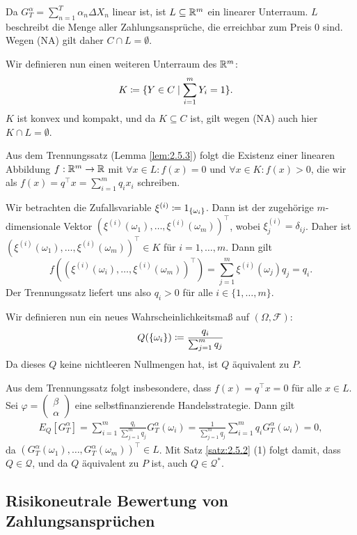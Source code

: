 \documentclass[a4paper,twoside,DIV15,BCOR12mm]{scrbook}
\newcommand{\cF}{\mathcal F}
\newcommand{\cQ}{\mathcal Q}
\begin{document}
\begin{beweis}
Da $G_T^\alpha = \sum_{n=1}^T \alpha_n \Delta X_n$ linear ist, ist $L\subseteq\mathbb{R}^m$ ein linearer Unterraum. $L$ beschreibt die Menge aller Zahlungsansprüche, die erreichbar zum Preis 0 sind. Wegen (NA) gilt daher $C\cap L =\emptyset$.

Wir definieren nun einen weiteren Unterraum des $\mathbb{R}^m$:
\begin{align*}
K &\da \{Y\in C \mid  \sum_{i=1}^m Y_i = 1\}.
\end{align*}
$K$ ist konvex und kompakt, und da $K\subseteq C$ ist, gilt wegen (NA) auch hier $K\cap L=\emptyset$.

Aus dem Trennungssatz (Lemma \ref{lem:2.5.3}) folgt die Existenz einer linearen Abbildung $f:\mathbb{R}^m\to \mathbb{R}$ mit $\forall x\in L: f(x)=0$ und $\forall x\in K: f(x) >0$, die wir als $f(x) = q^\top x = \sum_{i=1}^m q_i x_i$ schreiben.

Wir betrachten die Zufallsvariable $\xi^{(i)} \da 1_{\{\omega_i\}}$. Dann ist der zugehörige $m$-dimensionale Vektor $(\xi^{(i)}(\omega_1),\ldots,\xi^{(i)}(\omega_m))^\top$, wobei $\xi_j^{(i)} = \delta_{ij}$. Daher ist  $(\xi^{(i)}(\omega_1),\ldots,\xi^{(i)}(\omega_m))^\top\in K$ für $i=1,\ldots,m$. Dann gilt 
\[
f((\xi^{(i)}(\omega_i),\ldots,\xi^{(i)}(\omega_m))^\top) = \sum_{j=1}^m \xi^{(i)}(\omega_j)q_j = q_i.
\]
Der Trennungssatz liefert uns also $q_i>0$ für alle $i\in\{1,\ldots,m\}$.

Wir definieren nun ein neues Wahrscheinlichkeitsmaß auf $(\Omega, \cF)$:
\[
Q(\{\omega_i\}) \da \frac{q_i}{\sum_{j=1}^m q_j}
\]
Da dieses $Q$ keine nichtleeren Nullmengen hat, ist $Q$ äquivalent zu $P$.

Aus dem Trennungssatz folgt insbesondere, dass $f(x)=q^\top x=0$ für alle $x\in L$. Sei 
$\varphi=\left(\begin{smallmatrix} \beta \\ \alpha \end{smallmatrix}\right)$
eine selbstfinanzierende Handelsstrategie. Dann gilt 
\begin{align*}
E_Q[G_T^\alpha] = \sum_{i=1}^m \frac{q_i}{\sum_{j=1}^m q_j} G_T^\alpha(\omega_i) = \frac{1}{\sum_{j=1}^m q_j} \sum_{i=1}^m q_i G_T^\alpha(\omega_i) = 0,
\end{align*}
da $(G_T^\alpha(\omega_1),\ldots,G_T^\alpha(\omega_m))^\top\in L$. Mit Satz \ref{satz:2.5.2} (1) folgt damit, dass $Q\in \cQ$, und da $Q$ äquivalent zu $P$ ist, auch $Q\in \cQ^*$.
\end{beweis}

\subsection{Risikoneutrale Bewertung von Zahlungsansprüchen}
\end{document}
